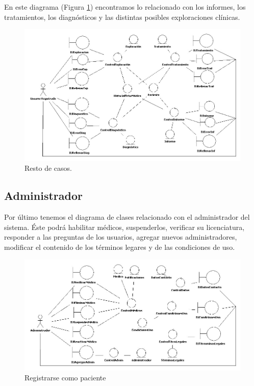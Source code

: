 \documentclass[a4paper,oneside,11pt]{book}
\begin{document}
		\newpage
		En este diagrama (Figura \ref{fig:col_clase14}) encontramos lo relacionado con los informes, los tratamientos, los diagnósticos y las distintas posibles exploraciones clínicas.
		\begin{figure}[H]
		  \centering
		    \includegraphics[width=16cm]{img/jpg/clases/13_Resto.jpg}
		  \caption{Resto de casos.}
		  \label{fig:col_clase14}
		\end{figure}
		
	\newpage
	\subsection{Administrador} %
	\label{sub:administrador}
		Por último tenemos el diagrama de clases relacionado con el administrador del sistema. Éste podrá habilitar médicos, suspenderlos, verificar su licenciatura, responder a las preguntas de los usuarios, agregar nuevos administradores, modificar el contenido de los términos legares y de las condiciones de uso.
		\begin{figure}[H]
		  \centering
		    \includegraphics[width=16cm]{img/jpg/clases/14_Administrador.jpg}
		  \caption{Registrarse como paciente}
		  \label{fig:col_clase15}
		\end{figure}
		
\end{document}
